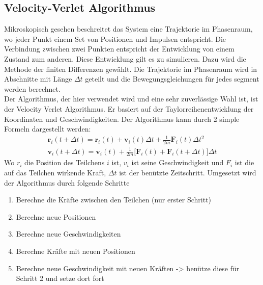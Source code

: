 \documentclass[12pt]{article}
\begin{document}
\subsection{Velocity-Verlet Algorithmus}
Mikroskopisch gesehen beschreitet das System eine Trajektorie im Phasenraum, 
wo jeder Punkt einem Set von Positionen und Impulsen entspricht. Die Verbindung zwischen
zwei Punkten entspricht der Entwicklung von einem Zustand zum anderen. Diese Entwicklung gilt es zu simulieren. Dazu wird 
die Methode der finiten Differenzen gewählt. Die Trajektorie im Phasenraum wird in Abschnitte mit Länge $\Delta t$ geteilt und die 
Bewegungsgleichungen für jedes segment werden berechnet.\\
Der Algorithmus, der hier verwendet wird und eine sehr zuverlässige Wahl ist, ist der Velocity Verlet Algorithmus. Er basiert auf der 
Taylorreihenentwicklung der Koordinaten und Geschwindigkeiten. Der Algorithmus kann durch 2 simple Formeln dargestellt werden:
\begin{equation}
    \label{eq:velocityverlet}
    \begin{aligned}
        \mathbf{r}_i(t+\Delta t) = \mathbf{r}_i(t) + {\mathbf{v}}_i(t) \Delta t + \frac1{2m} {\mathbf{F}}_i(t) \Delta t^2\\
        \mathbf{v}_i(t+\Delta t) = \mathbf{v}_i(t) + \frac1{2m} \Big[\mathbf{F}_i(t) + \mathbf{F}_i(t+\Delta t)\Big] \Delta t
    \end{aligned}
\end{equation}
Wo $r_i$ die Position des Teilchens $i$ ist, $v_i$ ist seine Geschwindigkeit und $F_i$ ist die auf das Teilchen wirkende Kraft, 
$\Delta t$ ist der benützte Zeitschritt. 
Umgesetzt wird der Algorithmus durch folgende Schritte
\begin{enumerate}
    \item Berechne die Kräfte zwischen den Teilchen (nur erster Schritt)
    \item Berechne neue Positionen
    \item Berechne neue Geschwindigkeiten 
    \item Berechne Kräfte mit neuen Positionen 
    \item Berechne neue Geschwindigkeit mit neuen Kräften -> benütze diese für Schritt 2 und setze dort fort
\end{enumerate}
\end{document}
